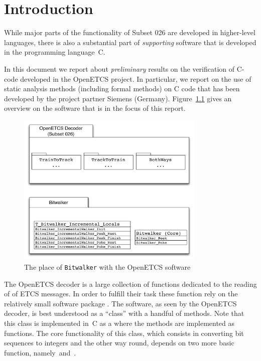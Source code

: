 
\chapter{Introduction}

While major parts of the functionality of {Subset 026} are developed in 
higher-level languages, there is also a substantial part of \emph{supporting} software
that is developed in the programming language~C.

In this document we report about \emph{preliminary} results on the verification
of C-code developed in the OpenETCS project.
In particular, we report on the use of static analysis methods (including formal methods)
on C code that has been developed by the project partner Siemens (Germany).
Figure~\ref{fig:Bitwalker-Overview} gives an overview on the software that
is in the focus of this report.

\begin{figure}[hbt]
\begin{center}
\includegraphics[width=0.8\textwidth]{figures/Bitwalker-Overview.pdf}
\caption{\label{fig:Bitwalker-Overview} The place of \texttt{Bitwalker} with the OpenETCS software}
\end{center}
\end{figure}

The OpenETCS decoder is a large collection of functions dedicated to
the reading of of ETCS messages.
In order to fulfill their task these function rely on the relatively
small software package .
The  software, as seen by the OpenETCS decoder,
is best understood as a ``class'' with a handful of methods.
Note that this class is implemented in~C as a  where
the methods are implemented as functions.
The core functionality  of this class, which consists in converting bit sequences to integers
and the other way round, depends on two more basic function, namely~\peek and~\poke.

